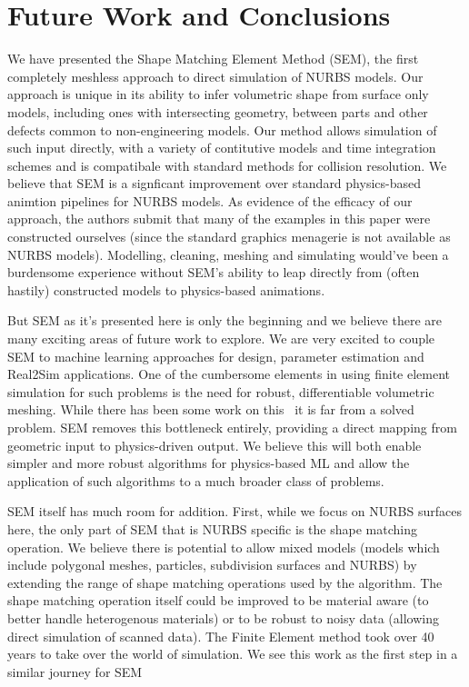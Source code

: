 \section{Future Work and Conclusions}

We have presented the Shape Matching Element Method (SEM), the first completely meshless approach to direct simulation of NURBS models.
Our approach is unique in its ability to infer volumetric shape from surface only models,
including ones with intersecting geometry, between parts and other defects common to non-engineering models.
Our method allows simulation of such input directly, with a variety of contitutive models and time integration schemes
and is compatibale with standard methods for collision resolution. 
We believe that SEM is a signficant improvement over standard physics-based animtion pipelines for NURBS models. 
As evidence of the efficacy of our approach, the authors submit that many of the examples in this paper were constructed ourselves
(since the standard graphics menagerie is not available as NURBS models). 
Modelling, cleaning, meshing and simulating would've been a burdensome experience without SEM's
ability to leap directly from (often hastily) constructed models to physics-based animations.

But SEM as it's presented here is only the beginning and we believe there are many exciting areas of future work to explore.
We are very excited to couple SEM to machine learning approaches for design, parameter estimation and Real2Sim applications.
One of the cumbersome elements in using finite element simulation for such problems is the need for robust, differentiable volumetric meshing.
While there has been some work on this~ it is far from a solved problem.
SEM removes this bottleneck entirely, providing a direct mapping from geometric input to physics-driven output. 
We believe this will both enable simpler and more robust algorithms for  physics-based ML and 
allow the application of such algorithms to a much broader class of problems. 

SEM itself has much room for addition.
First, while we focus on NURBS surfaces here, the only part of SEM that is NURBS specific is the shape matching operation.
We believe there is potential to allow mixed models (models which include polygonal meshes, particles, subdivision surfaces and NURBS)
by extending the range of shape matching operations used by the algorithm. The shape matching operation itself could be improved to be material aware 
(to better handle heterogenous materials) or to be robust to noisy data (allowing direct simulation of scanned data). The Finite Element method took over 
40 years to take over the world of simulation. 
We see this work as the first step in a similar journey for SEM
